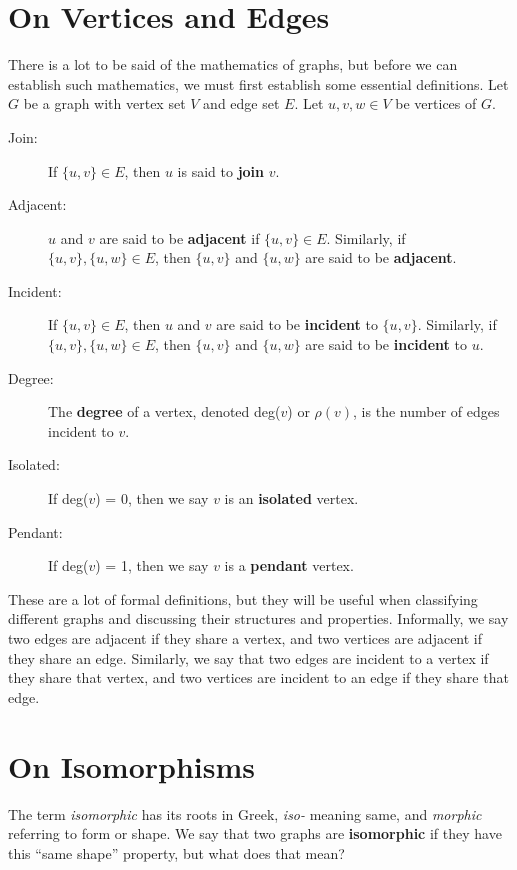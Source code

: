 \section{On Vertices and Edges}
There is a lot to be said of the mathematics of graphs, but before we can establish such mathematics, we must first establish some essential definitions. Let $G$ be a graph with vertex set $V$ and edge set $E$. Let $u, v, w \in V$ be vertices of $G$.
\begin{description}
    \item[Join:] If $\{u, v\} \in E$, then $u$ is said to \textbf{join} $v$.
    \item[Adjacent:] $u$ and $v$ are said to be \textbf{adjacent} if $\{u, v\} \in E$. Similarly, if $\{u, v\}, \{u, w\} \in E$, then $\{u, v\}$ and $\{u, w\}$ are said to be \textbf{adjacent}.
    \item[Incident:] If $\{u, v\} \in E$, then $u$ and $v$ are said to be \textbf{incident} to $\{u, v\}$. Similarly, if $\{u, v\}, \{u, w\} \in E$, then $\{u, v\}$ and $\{u, w\}$ are said to be \textbf{incident} to $u$.
    \item[Degree:] The \textbf{degree} of a vertex, denoted deg($v$) or $\rho(v)$, is the number of edges incident to $v$.
    \item[Isolated:] If deg($v$) = 0, then we say $v$ is an \textbf{isolated} vertex.
    \item[Pendant:] If deg($v$) = 1, then we say $v$ is a \textbf{pendant} vertex.
\end{description}
These are a lot of formal definitions, but they will be useful when classifying different graphs and discussing their structures and properties. Informally, we say two edges are adjacent if they share a vertex, and two vertices are adjacent if they share an edge. Similarly, we say that two edges are incident to a vertex if they share that vertex, and two vertices are incident to an edge if they share that edge. 

\section{On Isomorphisms}
The term \emph{isomorphic} has its roots in Greek, \emph{iso-} meaning same, and \emph{morphic} referring to form or shape. We say that two graphs are \textbf{isomorphic} if they have this ``same shape'' property, but what does that mean?

